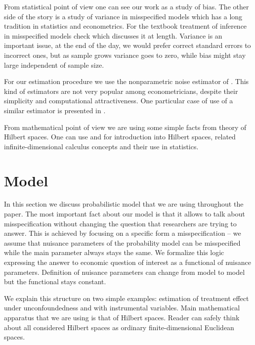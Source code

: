 \documentclass[12pt]{article}
\theoremstyle{plain}
\begin{document}
From statistical point of view one can see our work as a study of bias. The other side of the story is a study of variance in misspecified models which has a long tradition in statistics and econometrics. For the textbook treatment of inference in misspecified models check \parencite{anatolyev2011methods} which discusses it at length. Variance is an important issue, at the end of the day, we would prefer correct standard errors to incorrect ones, but as sample grows variance goes to zero, while bias might stay large independent of sample size. 

For our estimation procedure we use the nonparametric noise estimator of \parencite{liitiainen2008nonparametric}. This kind of estimators are not very popular among econometricians, despite their simplicity and computational attractiveness. One particular case of use of a similar estimator is presented in \parencite{abadie2006large}.

From mathematical point of view we are using some simple facts from theory of Hilbert spaces. One can use \parencite{bickel1993efficient} and \parencite{fernholz2012mises} for introduction into Hilbert spaces, related infinite-dimensional calculus concepts and their use in statistics. 

\section{Model}

In this section we discuss probabilistic model that we are using throughout the paper. The most important fact about our model is that it allows to talk about misspecification without changing the question that researchers are trying to answer. This is achieved by focusing on a specific form a misspecification -- we assume that nuisance parameters of the probability model can be misspecified while the main parameter always stays the same. We formalize this logic expressing the answer to economic question of interest as a functional of nuisance parameters. Definition of nuisance parameters can change from model to model but the functional stays constant. 

We explain this structure on two simple examples: estimation of treatment effect under unconfoundedness and with instrumental variables. Main mathematical apparatus that we are using is that of Hilbert spaces. Reader can safely think about all considered Hilbert spaces as ordinary finite-dimensional Euclidean spaces.
\end{document}
